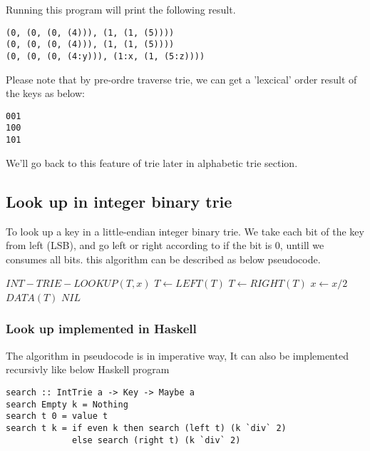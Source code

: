 \documentclass{article}
\begin{document}
Running this program will print the following result.

\begin{verbatim}
(0, (0, (0, (4))), (1, (1, (5))))
(0, (0, (0, (4))), (1, (1, (5))))
(0, (0, (0, (4:y))), (1:x, (1, (5:z))))
\end{verbatim}

Please note that by pre-ordre traverse trie, we can get a 'lexcical' order
result of the keys as below:

\begin{verbatim}
001
100
101
\end{verbatim}

We'll go back to this feature of trie later in alphabetic trie section.

\subsection{Look up in integer binary trie} 

To look up a key in a little-endian integer binary trie. We take each
bit of the key from left (LSB), and go left or right according to if
the bit is 0, untill we consumes all bits. this algorithm can be described
as below pseudocode.

\begin{algorithmic}
\STATE $INT-TRIE-LOOKUP(T, x)$
      \STATE $T \leftarrow LEFT(T)$
    \ELSE
      \STATE $T \leftarrow RIGHT(T)$
    \ENDIF
    \STATE $x \leftarrow x/2$
  \ENDWHILE
   \RETURN $DATA(T)$
  \ELSE \RETURN $NIL$ \ENDIF
\end{algorithmic}

\subsubsection*{Look up implemented in Haskell}
The algorithm in pseudocode is in imperative way, It can also be implemented 
recursivly like below Haskell program

\lstset{language=Haskell}
\begin{lstlisting}
search :: IntTrie a -> Key -> Maybe a
search Empty k = Nothing
search t 0 = value t
search t k = if even k then search (left t) (k `div` 2)
             else search (right t) (k `div` 2)
\end{lstlisting}
\end{document}
